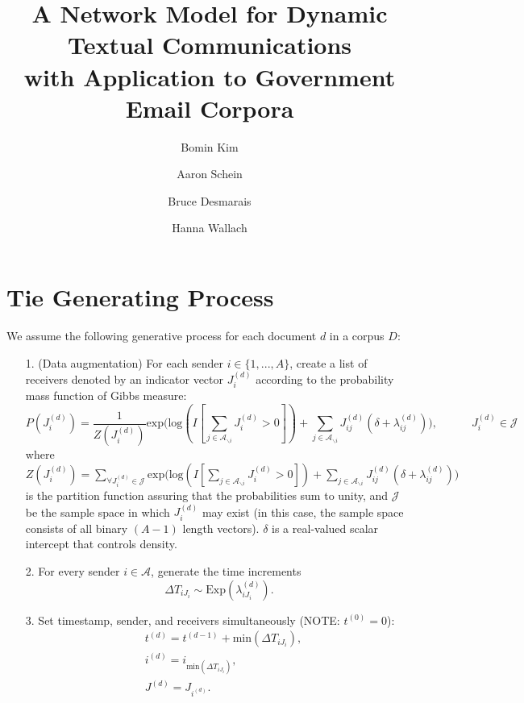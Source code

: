 \documentclass[a4paper]{article}
\title{A Network Model for Dynamic Textual Communications \\with Application to
	Government Email Corpora}
\author[1]{Bomin Kim}
\author[3]{Aaron Schein}
\author[1]{Bruce Desmarais}
\author[2,3]{Hanna Wallach}
\affil[1]{Pennsylvania State University}
\affil[2]{Microsoft Research NYC}
\affil[3]{University of Massachusetts Amherst}
\begin{document}
\maketitle
\section{Tie Generating Process}\label{subsec: Tie Generating Process}
We assume the following generative process for each document $d$ in a corpus $D$:
\begin{itemize}
	\item[1.] (Data augmentation) For each sender $i \in \{1,...,A\}$, create a list of receivers denoted by  an indicator vector $J^{(d)}_i$ according to the probability mass function of Gibbs measure:
	\begin{equation}P(J^{(d)}_i)  = \frac{1}{Z(J^{(d)}_i)}\mbox{exp}\Big(\mbox{log}(I[\sum\limits_{j \in \mathcal{A}_{\backslash i}}J^{(d)}_i>0])+\sum\limits_{j \in \mathcal{A}_{\backslash i}}J^{(d)}_{ij}(\delta+\lambda^{(d)}_{ij})\Big), \quad\quad\quad J^{(d)}_{i} \in \mathcal{J}
	\end{equation}
	where $Z(J^{(d)}_i) = \sum\limits_{\forall J^{(d)}_i \in \mathcal{J}}\mbox{exp}\Big(\mbox{log}(I[\sum\limits_{j \in \mathcal{A}_{\backslash i}}J^{(d)}_i>0])+\sum\limits_{j \in \mathcal{A}_{\backslash i}}J^{(d)}_{ij}(\delta+\lambda^{(d)}_{ij})\Big)$ is the partition function assuring that the probabilities sum to unity, and $\mathcal{J}$ be the sample space in which $J^{(d)}_i$ may exist (in this case, the sample space consists of all binary $(A-1)$ length vectors). $\delta$ is a real-valued scalar intercept that controls density.
	\item[2.] For every sender $i \in \mathcal{A}$, generate the time increments \begin{equation}
	\Delta T_{i{J_i}} \sim \mbox{Exp}(\lambda_{i{J_i}}^{(d)}).
	\end{equation}
	\item[3.] Set timestamp, sender, and receivers simultaneously (NOTE: $t^{(0)}=0$):
	\begin{equation}
	\begin{aligned}
	&t^{(d)} = t^{(d-1)}+\mbox{min}(\Delta T_{i{J_i}}),\\
	&i^{(d)} = i_{\mbox{min}(\Delta T_{i{J_i}})}, \\
	&J^{(d)} = J_{i^{(d)}}.
	\end{aligned}
	\end{equation}
\end{itemize}
\end{document}

